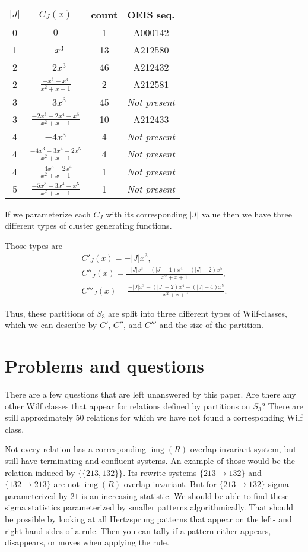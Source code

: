 \documentclass[a4paper, 11pt, english]{article}
\newcommand{\patternrule}{ \to \!}
\theoremstyle{definition}
\newcommand{\Sym}{S}
\DeclareMathOperator{\img}{img}
\begin{document}
\begin{center}
\begin{tabular}{c|c|c|c}
    $|J|$ & $C_J(x)$ & count & OEIS seq. \\
    \hline
    0 & $0$ & 1 & A000142 \\
    1 & $-x^3$ & 13 & A212580 \\
    2 & $-2x^3$ & 46 & A212432 \\
    2 & $\frac{-x^3-x^4}{x^2+x+1}$ & 2 & A212581 \\
    3 & $-3x^3$ & 45 & \emph{Not present} \\
    3 & $\frac{-2x^3-2x^4-x^5}{x^2+x+1}$ & 10 & A212433 \\
    4 & $-4x^3$ & 4 & \emph{Not present} \\
    4 & $\frac{-4x^3-3x^4-2x^5}{x^2+x+1}$ & 4 & \emph{Not present}\\
    4 & $\frac{-4x^3-2x^4}{x^2+x+1}$ & 1 & \emph{Not present} \\ 
    \hline
    \hline
    5 & $\frac{-5x^3-3x^4-x^5}{x^2+x+1}$ & 1 & \emph{Not present} \\ 
\end{tabular}
\end{center}
If we parameterize each $C_J$ with its corresponding $|J|$ value then we have
three different types of cluster generating functions.

Those types are 
\begin{gather*}
  C'_J(x) = -|J|x^3, \\
  C''_J(x) = \frac{-|J|x^3-(|J|-1)x^4-(|J|-2)x^5}{x^2+x+1}, \\
  C'''_J(x) = \frac{-|J|x^3-(|J|-2)x^4-(|J|-4)x^5}{x^2+x+1}.
\end{gather*}

Thus, these partitions of $\Sym_3$ are split into three different types
of Wilf-classes, which we can describe by $C'$, $C''$, and $C'''$ and the size
of the partition.

\section{Problems and questions}
There are a few questions that are left unanswered by this paper.
Are there any other Wilf classes that appear for relations defined by partitions on $\Sym_3$? There are
still approximately 50 relations for which we have not found a corresponding Wilf class. 

Not every relation has a corresponding $\img(R)$-overlap invariant system, but still have terminating and
confluent systems. An example of those would be the relation induced by $\{ \{ 213, 132
\} \}$. Its rewrite systems ${\{ 213 \patternrule 132 \}}$ and ${\{
132 \patternrule 213 \}}$ are not $\img(R)$ overlap invariant. 
But for $\{ 213 \patternrule 132 \}$ sigma parameterized by $21$ is an increasing statistic. We
should be able to find these sigma statistics parameterized by smaller patterns algorithmically.
That should be possible by looking at all Hertzsprung patterns that appear on the left- and right-hand
sides of a rule. Then you can tally if a pattern either appears, disappears, or moves when applying the rule.
\end{document}
